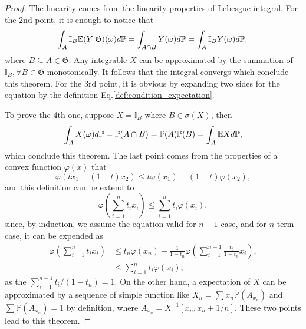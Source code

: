 \begin{proof}
The linearity comes from the linearity properties of Lebesgue integral. For the 2nd point, it is enough to notice that
\begin{equation*}
\int_A\mathbb{I}_{B}\mathbb{E}(Y|\mathfrak{G})(\omega)d\mathbb{P}=\int_{A\cap B}Y(\omega)d\mathbb{P}=\int_A\mathbb{I}_BY(\omega)d\mathbb{P},\\
\end{equation*}
where $B\subseteq A\in\mathfrak{G}$. Any integrable $X$ can be approximated by the summation of $\mathbb{I}_B,\forall B\in \mathfrak{G}$ monotonically. It follows that the integral convergs which conclude this theorem.
For the 3rd point, it is obvious by expanding two sides for the equation by the definition Eq.\ref{def:condition_expectation}. 

To prove the 4th one, suppose $X=\mathbb{I}_B$ where $B\in\sigma(X)$, then
\begin{equation*}
\int_A X(\omega)d\mathbb{P}=\mathbb{P}(A\cap B)=\mathbb{P}(A)\mathbb{P}(B)=\int_A \mathbb{E} Xd\mathbb{P},
\end{equation*}
which conclude this theorem.
The last point comes from the properties of a convex function $\varphi(x)$ that
\begin{equation}
\varphi(tx_1+(1-t)x_2)\le t\varphi(x_1)+(1-t)\varphi(x_2),
\end{equation}
and this definition can be extend to 
\begin{equation}
\varphi\left(\sum_{i=1}^nt_ix_i\right)\le\sum_{i=1}^nt_i\varphi(x_i),
\end{equation}
since, by induction, we assume the equation valid for $n-1$ case, and for $n$ term case, it can be expended as
\begin{equation*}
\begin{aligned}
\varphi\left(\sum_{i=1}^nt_ix_i\right)&\le t_n\varphi(x_n)+\frac{1}{1-t_n}\varphi\left(\sum_{i=1}^{n-1}\frac{t_i}{1-t_n}x_i\right),\\
&\le\sum_{i=1}^nt_i\varphi(x_i),
\end{aligned}
\end{equation*}
as the $\sum_{i=1}^{n-1}t_i/(1-t_n)=1$. On the other hand, a expectation of $X$ can be approximated by a sequence of simple function like $X_n=\sum x_n\mathbb{P}(A_{x_n})$ and $\sum\mathbb{P}(A_{x_n})=1$ by definition, where $A_{x_n}=X^{-1}[x_n,x_n+1/n]$. These two points lead to this theorem.
\end{proof}


